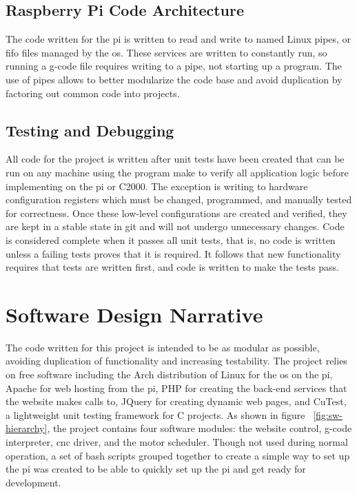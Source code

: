\subsection{Raspberry Pi Code Architecture}
The code written for the \gls{pi} is written to read and write to named Linux pipes, or \gls{fifo} files managed by the \gls{os}.
These services are written to constantly run, so running a g-code file requires writing to a pipe, not starting up a program.
The use of pipes allows to better modularize the code base and avoid duplication by factoring out common code into projects.

\subsection{Testing and Debugging}
All code for the project is written after unit tests have been created that can be run on any machine using the program make to verify all application logic before implementing on the \gls{pi} or C2000.
The exception is writing to hardware configuration registers which must be changed, programmed, and manually tested for correctness.
Once these low-level configurations are created and verified, they are kept in a stable state in git and will not undergo unnecessary changes.
Code is considered complete when it passes all unit tests, that is, no code is written unless a failing tests proves that it is required.
It follows that new functionality requires that tests are written first, and code is written to make the tests pass.

\section{Software Design Narrative}
The code written for this project is intended to be as modular as possible, avoiding duplication of functionality and increasing testability.
The project relies on free software including the Arch distribution of Linux\cite{archlinux} for the \gls{os} on the \gls{pi}, Apache for web hosting from the \gls{pi}, PHP for creating the back-end services that the website makes calls to, JQuery for creating dynamic web pages, and CuTest, a lightweight unit testing framework for C projects.
As shown in figure ~\ref{fig:sw-hierarchy}, the project contains four software modules: the website control, g-code interpreter, \gls{cnc} driver, and the motor scheduler.
Though not used during normal operation, a set of bash scripts grouped together to create a simple way to set up the \gls{pi} was created to be able to quickly set up the \gls{pi} and get ready for development.

